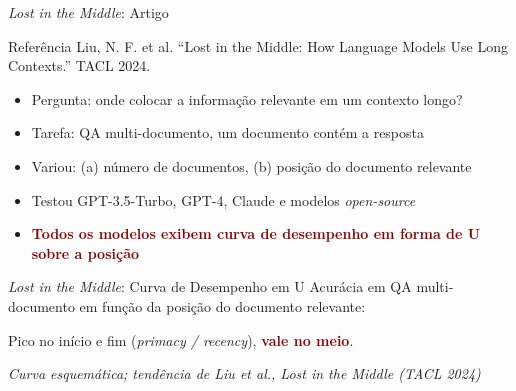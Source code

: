 \documentclass[aspectratio=169, xcolor=dvipsnames]{beamer}
\begin{document}
  \begin{frame}{\textit{Lost in the Middle}: Artigo}
    \begin{block}{Referência}
      Liu, N. F. et al. ``Lost in the Middle: How Language Models Use Long Contexts.'' TACL 2024.
    \end{block}
    \begin{itemize}
      \item Pergunta: onde colocar a informação relevante em um contexto longo?
      \item Tarefa: QA multi-documento, um documento contém a resposta
      \item Variou: (a) número de documentos, (b) posição do documento relevante
      \item Testou GPT-3.5-Turbo, GPT-4, Claude e modelos \textit{open-source}
      \item \textcolor{DarkRed}{\textbf{Todos os modelos exibem curva de desempenho em forma de U sobre a posição}}
    \end{itemize}
  \end{frame}

  \begin{frame}{\textit{Lost in the Middle}: Curva de Desempenho em U}
    Acurácia em QA multi-documento em função da posição do documento relevante:

    \centering

    Pico no início e fim (\textit{primacy / recency}), \textcolor{DarkRed}{\textbf{vale no meio}}.

    {\scriptsize\textit{Curva esquemática; tendência de Liu et al., Lost in the Middle (TACL 2024)}}
  \end{frame}
\end{document}
